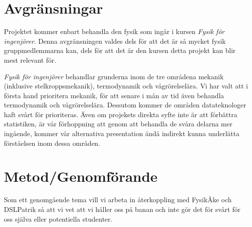 \documentclass[12pt,a4paper]{article}
\begin{document}
\section{Avgränsningar}

Projektet kommer enbart behandla den fysik som ingår i kursen \textit{Fysik för ingenjörer}. Denna avgränsningen valdes dels för att det är så mycket fysik gruppmedlemmarna kan, dels för att det är den kursen detta projekt kan blir mest relevant för.

\textit{Fysik för ingenjörer} behandlar grunderna inom de tre områdena mekanik (inklusive stelkroppsmekanik), termodynamik och vågrörelselära. Vi har valt att i första hand prioritera mekanik, för att senare i mån av tid även behandla termodynamik och vågrörelselära. Dessutom kommer de områden datateknologer haft svårt för prioriteras. Även om projekets direkta syfte inte är att förbättra statistiken, är vår förhoppning att genom att behandla de svåra delarna mer ingående, kommer vår alternativa presentation ändå indirekt kunna underlätta förståelsen inom dessa områden.







\section{Metod/Genomförande}

Som ett genomgående tema vill vi arbeta in återkoppling med FysikÅke och DSLPatrik så att vi vet att vi håller oss på banan och inte gör det för svårt för oss själva eller potentiella studenter.
\end{document}
